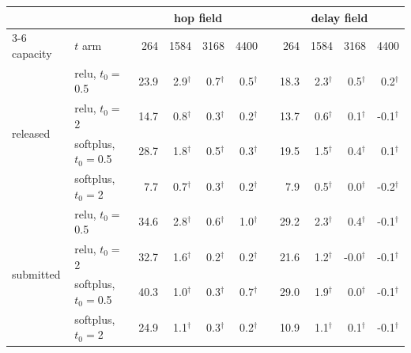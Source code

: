 \begin{tabular}{@{}llrrrrcrrrr@{}}
\toprule
& & \multicolumn{4}{c}{hop field} & & \multicolumn{4}{c}{delay field} \\
\cmidrule{3-6}\cmidrule{8-11}
capacity & $t$ arm & 264 & 1584 & 3168 & 4400 & & 264 & 1584 & 3168 & 4400 \\
\midrule
\multirow{4}{*}{released} & relu, $t_0{=}$0.5 & 23.9 & 2.9$^{\dagger}$ & 0.7$^{\dagger}$ & 0.5$^{\dagger}$ & & 18.3 & 2.3$^{\dagger}$ & 0.5$^{\dagger}$ & 0.2$^{\dagger}$ \\
 & relu, $t_0{=}$2 & 14.7 & 0.8$^{\dagger}$ & 0.3$^{\dagger}$ & 0.2$^{\dagger}$ & & 13.7 & 0.6$^{\dagger}$ & 0.1$^{\dagger}$ & -0.1$^{\dagger}$ \\
 & softplus, $t_0{=}$0.5 & 28.7 & 1.8$^{\dagger}$ & 0.5$^{\dagger}$ & 0.3$^{\dagger}$ & & 19.5 & 1.5$^{\dagger}$ & 0.4$^{\dagger}$ & 0.1$^{\dagger}$ \\
 & softplus, $t_0{=}$2 & 7.7 & 0.7$^{\dagger}$ & 0.3$^{\dagger}$ & 0.2$^{\dagger}$ & & 7.9 & 0.5$^{\dagger}$ & 0.0$^{\dagger}$ & -0.2$^{\dagger}$ \\
\midrule
\multirow{4}{*}{submitted} & relu, $t_0{=}$0.5 & 34.6 & 2.8$^{\dagger}$ & 0.6$^{\dagger}$ & 1.0$^{\dagger}$ & & 29.2 & 2.3$^{\dagger}$ & 0.4$^{\dagger}$ & -0.1$^{\dagger}$ \\
 & relu, $t_0{=}$2 & 32.7 & 1.6$^{\dagger}$ & 0.2$^{\dagger}$ & 0.2$^{\dagger}$ & & 21.6 & 1.2$^{\dagger}$ & -0.0$^{\dagger}$ & -0.1$^{\dagger}$ \\
 & softplus, $t_0{=}$0.5 & 40.3 & 1.0$^{\dagger}$ & 0.3$^{\dagger}$ & 0.7$^{\dagger}$ & & 29.0 & 1.9$^{\dagger}$ & 0.0$^{\dagger}$ & -0.1$^{\dagger}$ \\
 & softplus, $t_0{=}$2 & 24.9 & 1.1$^{\dagger}$ & 0.3$^{\dagger}$ & 0.2$^{\dagger}$ & & 10.9 & 1.1$^{\dagger}$ & 0.1$^{\dagger}$ & -0.1$^{\dagger}$ \\
\bottomrule
\end{tabular}
